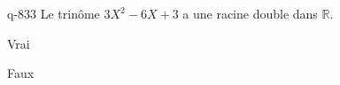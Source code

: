 \begin{truefalse}{q-833}
Le trinôme $3X^2-6X+3$ a une racine double dans $\mathbb R$.
\item* Vrai
\item Faux
\end{truefalse}

